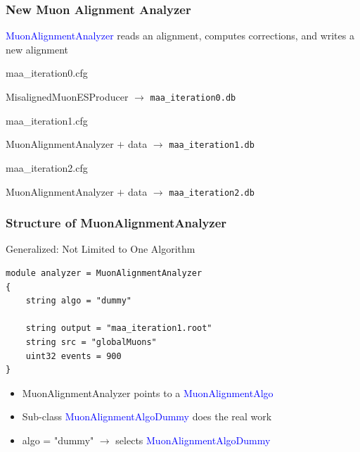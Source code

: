 \documentclass[12pt,compress]{beamer}
\begin{document}
\begin{frame}
\frametitle{New Muon Alignment Analyzer}

\textcolor{blue}{MuonAlignmentAnalyzer} reads an alignment, computes corrections, and writes a new alignment

\vfill
\begin{description}
\item[maa\_iteration0.cfg]
\end{description}
\vspace{-0.5 cm}
\begin{center}
MisalignedMuonESProducer $\to$ {\tt maa\_iteration0.db}
\end{center}

\begin{description}
\item[maa\_iteration1.cfg]
\end{description}
\vspace{-0.5 cm}
\begin{center}
MuonAlignmentAnalyzer $+$ data $\to$ {\tt maa\_iteration1.db}
\end{center}

\begin{description}
\item[maa\_iteration2.cfg]
\end{description}
\vspace{-0.5 cm}
\begin{center}
MuonAlignmentAnalyzer $+$ data $\to$ {\tt maa\_iteration2.db}
\end{center}
\end{frame}

\begin{frame}[fragile]
\frametitle{Structure of MuonAlignmentAnalyzer}
\begin{description}
\item[Generalized: Not Limited to One Algorithm]
\end{description}
\hspace{1 cm} \begin{minipage}{\linewidth}
\scriptsize
\begin{verbatim}
module analyzer = MuonAlignmentAnalyzer
{
    string algo = "dummy"

    string output = "maa_iteration1.root"
    string src = "globalMuons"
    uint32 events = 900
}
\end{verbatim}
\end{minipage}

\vfill
\begin{itemize}\setlength{\itemsep}{0.25 cm}
\item MuonAlignmentAnalyzer points to a \textcolor{blue}{MuonAlignmentAlgo}
\item Sub-class \textcolor{blue}{MuonAlignmentAlgoDummy} does the real work
\item algo = "dummy" $\to$ selects \textcolor{blue}{MuonAlignmentAlgoDummy}
\end{itemize}
\end{frame}
\end{document}
